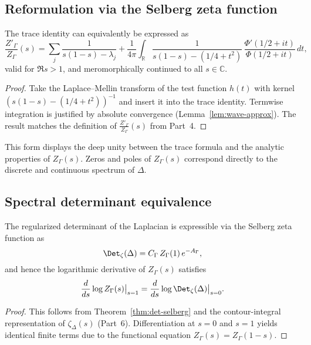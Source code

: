 \subsection{Reformulation via the Selberg zeta function}
\label{subsec:ch4-part8-zeta}
\relax

\begin{theorem}
\label{thm:zeta-derivative}
The trace identity can equivalently be expressed as
\[
\frac{Z'_\Gamma}{Z_\Gamma}(s)
= \sum_{j}\frac{1}{s(1-s)-\lambda_j}
+ \frac{1}{4\pi}\int_{\mathbb{R}}
\frac{1}{s(1-s)-(1/4+t^2)}\,
\frac{\Phi'(1/2+it)}{\Phi(1/2+it)}\,dt,
\]
valid for $\Re s>1$, and meromorphically continued to all $s\in\mathbb{C}$.
\end{theorem}

\begin{proof}\relax
Take the Laplace–Mellin transform of the test function $h(t)$ with kernel $(s(1-s)-(1/4+t^2))^{-1}$ and insert it into the trace identity.  
Termwise integration is justified by absolute convergence (Lemma~\ref{lem:wave-approx}).  
The result matches the definition of $\frac{Z'_\Gamma}{Z_\Gamma}(s)$ from Part~4.
\end{proof}

\begin{remark}
This form displays the deep unity between the trace formula and the analytic properties of $Z_\Gamma(s)$.  
Zeros and poles of $Z_\Gamma(s)$ correspond directly to the discrete and continuous spectrum of $\Delta$.
\end{remark}

\subsection{Spectral determinant equivalence}
\label{subsec:ch4-part8-determinant}
\relax

\begin{corollary}
\label{cor:determinant-identity}
The regularized determinant of the Laplacian is expressible via the Selberg zeta function as
\[
\Det_\zeta(\Delta) = C_\Gamma\,Z_\Gamma(1)\,e^{-A_\Gamma},
\]
and hence the logarithmic derivative of $Z_\Gamma(s)$ satisfies
\[
\frac{d}{ds}\log Z_\Gamma(s)\big|_{s=1}
= \frac{d}{ds}\log\Det_\zeta(\Delta)\big|_{s=0}.
\]
\end{corollary}

\begin{proof}\relax
This follows from Theorem~\ref{thm:det-selberg} and the contour-integral representation of $\zeta_\Delta(s)$ (Part~6).  
Differentiation at $s=0$ and $s=1$ yields identical finite terms due to the functional equation $Z_\Gamma(s)=Z_\Gamma(1-s)$.
\end{proof}

